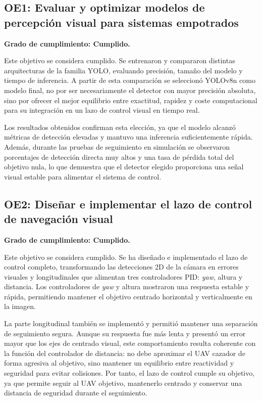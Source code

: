 \vspace{0.3cm}

\subsection*{\textbf{OE1: Evaluar y optimizar modelos de percepción visual para sistemas empotrados}}

\textbf{Grado de cumplimiento: Cumplido.}

Este objetivo se considera cumplido. Se entrenaron y compararon distintas arquitecturas de la familia YOLO, evaluando precisión, tamaño del modelo y tiempo de inferencia. A partir de esta comparación se seleccionó YOLOv8n como modelo final, no por ser necesariamente el detector con mayor precisión absoluta, sino por ofrecer el mejor equilibrio entre exactitud, rapidez y coste computacional para su integración en un lazo de control visual en tiempo real.

\vspace{0.2cm}

Los resultados obtenidos confirman esta elección, ya que el modelo alcanzó métricas de detección elevadas y mantuvo una inferencia suficientemente rápida. Además, durante las pruebas de seguimiento en simulación se observaron porcentajes de detección directa muy altos y una tasa de pérdida total del objetivo nula, lo que demuestra que el detector elegido proporciona una señal visual estable para alimentar el sistema de control.

\vspace{0.3cm}

\subsection*{\textbf{OE2: Diseñar e implementar el lazo de control de navegación visual}}

\textbf{Grado de cumplimiento: Cumplido.}

Este objetivo se considera cumplido. Se ha diseñado e implementado el lazo de control completo, transformando las detecciones 2D de la cámara en errores visuales y longitudinales que alimentan tres controladores PID: \textit{yaw}, altura y distancia. Los controladores de \textit{yaw} y altura mostraron una respuesta estable y rápida, permitiendo mantener el objetivo centrado horizontal y verticalmente en la imagen.

\vspace{0.2cm}

La parte longitudinal también se implementó y permitió mantener una separación de seguimiento segura. Aunque su respuesta fue más lenta y presentó un error mayor que los ejes de centrado visual, este comportamiento resulta coherente con la función del controlador de distancia: no debe aproximar el UAV cazador de forma agresiva al objetivo, sino mantener un equilibrio entre reactividad y seguridad para evitar colisiones. Por tanto, el lazo de control cumple su objetivo, ya que permite seguir al UAV objetivo, mantenerlo centrado y conservar una distancia de seguridad durante el seguimiento.

